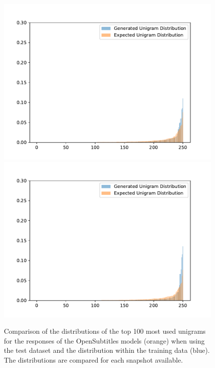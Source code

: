 \begin{figure}[H]
	\includegraphics[width=\linewidth]{img/plots/opensubtitles_not_reversed/unigram_distribution_comparison_step_2500000.pdf}
	\centering
	\small
	\endminipage\hfill
	\includegraphics[width=\linewidth]{img/plots/opensubtitles_not_reversed/unigram_distribution_comparison_step_3000000.pdf}
	\centering
	\small
	\endminipage\hfill
	\caption{Comparison of the distributions of the top 100 most used unigrams for the responses of the OpenSubtitles models (orange) when using the test dataset and the distribution within the training data (blue). The distributions are compared for each snapshot available.}
	\label{results:unigram:distributions:opensubtitles}
\end{figure}

